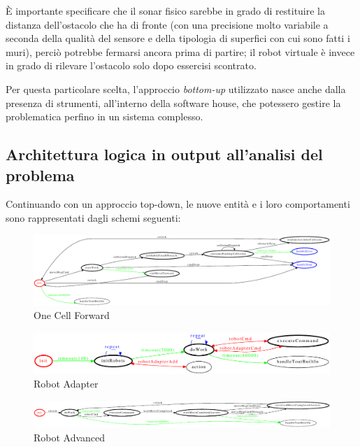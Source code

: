 È importante specificare che il sonar fisico sarebbe in grado di restituire la distanza dell'ostacolo che ha di fronte
(con una precisione molto variabile a seconda della qualità del sensore e della tipologia di superfici con cui sono fatti i muri),
perciò potrebbe fermarsi ancora prima di partire;
il robot virtuale è invece in grado di rilevare l'ostacolo solo dopo essercisi scontrato.

Per questa particolare scelta, l'approccio \textit{bottom-up} utilizzato nasce anche dalla presenza di strumenti, all'interno della software house, che potessero gestire la problematica perfino in un sistema complesso.

\subsection{Architettura logica in output all'analisi del problema}

Continuando con un approccio top-down, le nuove entità e i loro comportamenti sono rappresentati dagli schemi seguenti:

\begin{figure}[H]
  \centering
  \includegraphics[width=\textwidth]{res/sprint2/onecellforward}
  \caption{One Cell Forward}%
  \label{fig:sp2:ocf}
\end{figure}

\begin{figure}[H]
  \centering
  \includegraphics[width=\textwidth]{res/sprint2/robot_adapter}
  \caption{Robot Adapter}%
  \label{fig:sp2:r_adpt}
\end{figure}

\begin{figure}[H]
  \centering
  \includegraphics[width=\textwidth]{res/sprint2/robot_advanced}
  \caption{Robot Advanced}%
  \label{fig:sp2:r_adv}
\end{figure}

